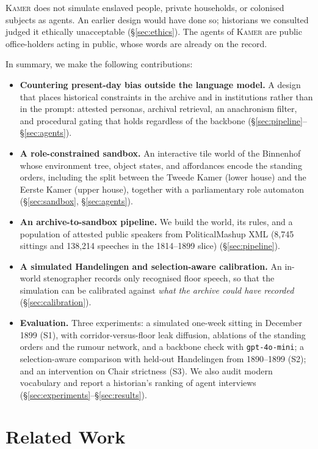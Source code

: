 \documentclass[sigconf,review,anonymous]{acmart}
\newcommand{\sys}{\textsc{Kamer}}
\begin{document}
\sys{} does not simulate enslaved people, private households, or colonised
subjects as agents. An earlier design would have done so; historians we
consulted judged it ethically unacceptable (\S\ref{sec:ethics}). The agents
of \sys{} are public office-holders acting in public, whose words are
already on the record.

In summary, we make the following contributions:
\begin{itemize}[leftmargin=*,nosep]
  \item \textbf{Countering present-day bias outside the language model.} A design
  that places historical constraints in the archive and in institutions
  rather than in the prompt: attested personas, archival retrieval, an
  anachronism filter, and procedural gating that holds regardless of the
  backbone (\S\ref{sec:pipeline}--\S\ref{sec:agents}).
  \item \textbf{A role-constrained sandbox.} An interactive tile world of
  the Binnenhof whose environment tree, object states, and affordances encode
  the standing orders, including the split between the Tweede Kamer (lower
  house) and the Eerste Kamer (upper house), together with a parliamentary
  role automaton (\S\ref{sec:sandbox}, \S\ref{sec:agents}).
  \item \textbf{An archive-to-sandbox pipeline.} We build the world, its
  rules, and a population of attested public speakers from PoliticalMashup
  XML (8{,}745 sittings and 138{,}214 speeches in the 1814--1899 slice)
  (\S\ref{sec:pipeline}).
  \item \textbf{A simulated Handelingen and selection-aware calibration.} An
  in-world stenographer records only recognised floor speech, so that the
  simulation can be calibrated against \emph{what the archive could have
  recorded} (\S\ref{sec:calibration}).
  \item \textbf{Evaluation.} Three experiments: a simulated one-week
  sitting in December 1899 (S1), with corridor-versus-floor leak diffusion,
  ablations of the standing orders and the rumour network, and a backbone
  check with \texttt{gpt-4o-mini}; a selection-aware comparison with
  held-out Handelingen from 1890--1899 (S2); and an intervention on Chair
  strictness (S3). We also audit modern vocabulary and report a historian's
  ranking of agent interviews (\S\ref{sec:experiments}--\S\ref{sec:results}).
\end{itemize}

\section{Related Work}
\label{sec:related}
\end{document}
